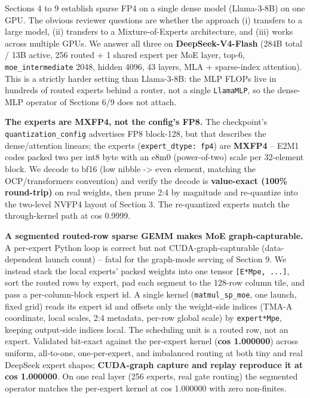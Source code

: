 \documentclass[
]{article}
\begin{document}
Sections 4 to 9 establish sparse FP4 on a single dense model
(Llama-3-8B) on one GPU. The obvious reviewer questions are whether the
approach (i) transfers to a large model, (ii) transfers to a
Mixture-of-Experts architecture, and (iii) works across multiple GPUs.
We answer all three on \textbf{DeepSeek-V4-Flash} (284B total / 13B
active, 256 routed + 1 shared expert per MoE layer, top-6,
\texttt{moe\_intermediate} 2048, hidden 4096, 43 layers, MLA +
sparse-index attention). This is a strictly harder setting than
Llama-3-8B: the MLP FLOPs live in hundreds of routed experts behind a
router, not a single \texttt{LlamaMLP}, so the dense-MLP operator of
Sections 6/9 does not attach.

\textbf{The experts are MXFP4, not the config's FP8.} The checkpoint's
\texttt{quantization\_config} advertises FP8 block-128, but that
describes the dense/attention linears; the experts
(\texttt{expert\_dtype:\ fp4}) are \textbf{MXFP4} -- E2M1 codes packed
two per int8 byte with an e8m0 (power-of-two) scale per 32-element
block. We decode to bf16 (low nibble -\textgreater{} even element,
matching the OCP/transformers convention) and verify the decode is
\textbf{value-exact (100\% round-trip)} on real weights, then prune 2:4
by magnitude and re-quantize into the two-level NVFP4 layout of Section
3. The re-quantized experts match the through-kernel path at cos 0.9999.

\textbf{A segmented routed-row sparse GEMM makes MoE graph-capturable.}
A per-expert Python loop is correct but not CUDA-graph-capturable
(data-dependent launch count) -- fatal for the graph-mode serving of
Section 9. We instead stack the local experts' packed weights into one
tensor \texttt{{[}E*Mpe,\ ...{]}}, sort the routed rows by expert, pad
each segment to the 128-row column tile, and pass a per-column-block
expert id. A single kernel (\texttt{matmul\_sp\_moe}, one launch, fixed
grid) reads its expert id and offsets only the weight-side indices
(TMA-A coordinate, local scales, 2:4 metadata, per-row global scale) by
\texttt{expert*Mpe}, keeping output-side indices local. The scheduling
unit is a routed row, not an expert. Validated bit-exact against the
per-expert kernel (\textbf{cos 1.000000}) across uniform, all-to-one,
one-per-expert, and imbalanced routing at both tiny and real DeepSeek
expert shapes; \textbf{CUDA-graph capture and replay reproduce it at cos
1.000000}. On one real layer (256 experts, real gate routing) the
segmented operator matches the per-expert kernel at cos 1.000000 with
zero non-finites.
\end{document}
